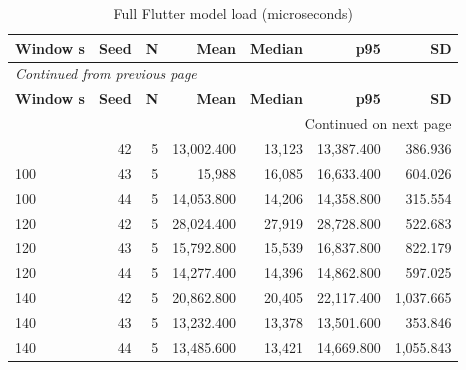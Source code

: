 \documentclass[10pt,a4paper]{article}
\begin{document}
\begin{longtable}{@{}lrrrrrr@{}}
\caption{Full Flutter model load (microseconds)}\\
\toprule
\textbf{Window s} & \textbf{Seed} & \textbf{N} & \textbf{Mean} & \textbf{Median} & \textbf{p95} & \textbf{SD} \\
\midrule\endfirsthead
\multicolumn{7}{l}{\small\itshape Continued from previous page}\\
\toprule
\textbf{Window s} & \textbf{Seed} & \textbf{N} & \textbf{Mean} & \textbf{Median} & \textbf{p95} & \textbf{SD} \\
\midrule\endhead
\midrule\multicolumn{7}{r}{\small Continued on next page}\\\endfoot
\bottomrule\endlastfoot
100 & 42 & 5 & 13,002.400 & 13,123 & 13,387.400 & 386.936 \\
100 & 43 & 5 & 15,988 & 16,085 & 16,633.400 & 604.026 \\
100 & 44 & 5 & 14,053.800 & 14,206 & 14,358.800 & 315.554 \\
120 & 42 & 5 & 28,024.400 & 27,919 & 28,728.800 & 522.683 \\
120 & 43 & 5 & 15,792.800 & 15,539 & 16,837.800 & 822.179 \\
120 & 44 & 5 & 14,277.400 & 14,396 & 14,862.800 & 597.025 \\
140 & 42 & 5 & 20,862.800 & 20,405 & 22,117.400 & 1,037.665 \\
140 & 43 & 5 & 13,232.400 & 13,378 & 13,501.600 & 353.846 \\
140 & 44 & 5 & 13,485.600 & 13,421 & 14,669.800 & 1,055.843 \\
\end{longtable}\endgroup
\begingroup\small\setlength{\tabcolsep}{4pt}\renewcommand{\arraystretch}{1.12}
\end{document}
